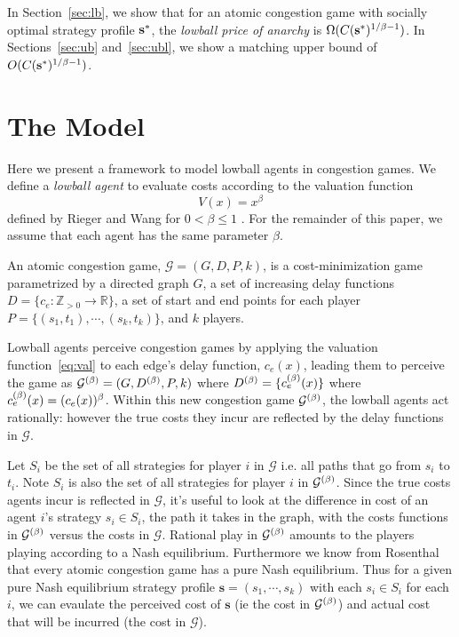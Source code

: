\documentclass[twoside]{article}
\begin{document}
\begin{multicols}{2}
In Section~\ref{sec:lb}, we show that for an atomic congestion game with
socially optimal strategy profile $\mathbf{s}^*$, the \textit{lowball price of anarchy} is
$\Omega(C(\mathbf{s}^*)^{1/\beta-1})$. In Sections~\ref{sec:ub} and~\ref{sec:ubl}, we
show a matching upper bound of $O(C(\mathbf{s}^*)^{1/\beta - 1})$.

\section{The Model}

Here we present a framework to model lowball agents in congestion games. We define a 
\textit{lowball agent} to evaluate costs according to the valuation function
\begin{equation}
  V(x) = x^{\beta}
  \label{eq:val}
\end{equation}
defined by Rieger and Wang for $0 < \beta \le 1$ \cite{Rieger2008}. For the
remainder of this paper, we assume that each agent has the same parameter
$\beta$.

An atomic congestion game, $\mathcal{G} = (G, D, P, k)$, is a
cost-minimization game parametrized by a directed graph $G$, a set of increasing
delay functions $D = \{c_e : \mathbb{Z}_{>0} \to \mathbb{R}\}$, a set of start
and end points for each player $P =\{(s_1, t_1), \cdots, (s_k, t_k)\}$, and $k$
players.

Lowball agents perceive congestion games by applying the valuation
function~\eqref{eq:val} to each edge's delay function, $c_e(x)$, leading them to
perceive the game as $\mathcal{G}^{(\beta)}= (G, D^{(\beta)}, P, k)$ where $D^{(\beta)} =
\{c_e^{(\beta)}(x)\}$ where $c_e^{(\beta)}(x) = (c_e(x))^\beta$. Within this new
congestion game $\mathcal{G}^{(\beta)}$, the lowball agents act rationally: however
the true costs they incur are reflected by the delay functions in $\mathcal{G}$.   

Let $S_i$ be the set of all strategies for player $i$ in $\mathcal{G}$ i.e. all
paths that go from $s_i$ to $t_i$.  Note $S_i$ is also the set of all strategies for
player $i$ in $\mathcal{G}^{(\beta)}$.  Since the true costs agents incur is
reflected in $\mathcal{G}$, it's useful to look at the difference in cost of an
agent $i$'s strategy $s_i \in S_i$, the path it takes in the graph, with the
costs functions in $\mathcal{G}^{(\beta)}$ versus the costs in $\mathcal{G}$.
Rational play in $\mathcal{G}^{(\beta)}$ amounts to the players playing according to
a Nash equilibrium.  Furthermore we know from Rosenthal \cite{Rosenthal1973}
that every atomic congestion game has a pure Nash equilibrium.  Thus for a given
pure Nash equilibrium strategy profile $\mathbf{s} = (s_1, \cdots, s_k)$ with
each $s_i \in S_i$ for each $i$, we can evaulate the perceived cost of
$\mathbf{s}$ (ie the cost in $\mathcal{G}^{(\beta)}$) and actual cost that will be
incurred (the cost in $\mathcal{G}$).


\end{multicols}
\end{document}

